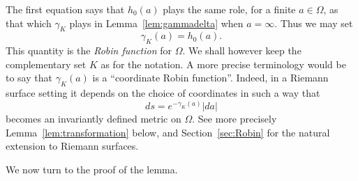 \documentclass[reqno,12pt]{article}
\theoremstyle{plain}
\theoremstyle{definition}
\numberwithin{equation}{section}
\numberwithin{figure}{section}
\begin{document}
The first equation says that $h_0(a)$ plays the same role, for a finite $a\in\Omega$, 
as that which $\gamma_K$ plays in Lemma~\ref{lem:gammadelta} when $a=\infty$. Thus we may set
$$
\gamma_K(a)=h_0(a).
$$
This quantity is the {\it Robin function} for $\Omega$. We shall however keep the complementary set
$K$ as for the notation. A more precise terminology would be to say that $\gamma_K(a)$ is a ``coordinate Robin function''.
Indeed, in a Riemann surface setting it depends on the choice of coordinates in such a way that 
\begin{equation}\label{dsegamma}
ds=e^{-\gamma_K(a)}|da|
\end{equation}
becomes an invariantly defined metric on $\Omega$. See more precisely Lemma~\ref{lem:transformation} below,
and Section~\ref{sec:Robin} for the natural extension to Riemann surfaces.

We now turn to the proof of the lemma.
\end{document}
